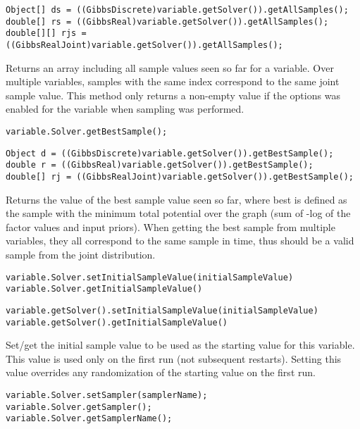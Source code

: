 \ifjava
\begin{lstlisting}
Object[] ds = ((GibbsDiscrete)variable.getSolver()).getAllSamples();
double[] rs = ((GibbsReal)variable.getSolver()).getAllSamples();
double[][] rjs = ((GibbsRealJoint)variable.getSolver()).getAllSamples();
\end{lstlisting}
\fi

Returns an array including all sample values seen so far for a variable. Over multiple variables, samples with the same index correspond to the same joint sample value. This method only returns a non-empty value if the  options was enabled for the variable when sampling was performed.

\ifmatlab
\begin{lstlisting}
variable.Solver.getBestSample();
\end{lstlisting}
\fi

\ifjava
\begin{lstlisting}
Object d = ((GibbsDiscrete)variable.getSolver()).getBestSample();
double r = ((GibbsReal)variable.getSolver()).getBestSample();
double[] rj = ((GibbsRealJoint)variable.getSolver()).getBestSample();
\end{lstlisting}
\fi


Returns the value of the best sample value seen so far, where best is defined as the sample with the minimum total potential over the graph (sum of -log of the factor values and input priors).  When getting the best sample from multiple variables, they all correspond to the same sample in time, thus should be a valid sample from the joint distribution.

\ifmatlab
\begin{lstlisting}
variable.Solver.setInitialSampleValue(initialSampleValue)
variable.Solver.getInitialSampleValue()
\end{lstlisting}
\fi

\ifjava
\begin{lstlisting}
variable.getSolver().setInitialSampleValue(initialSampleValue)
variable.getSolver().getInitialSampleValue()
\end{lstlisting}
\fi

Set/get the initial sample value to be used as the starting value for this variable.  This value is used only on the first run (not subsequent restarts).  Setting this value overrides any randomization of the starting value on the first run.


\ifmatlab
\begin{lstlisting}
variable.Solver.setSampler(samplerName);
variable.Solver.getSampler();
variable.Solver.getSamplerName();
\end{lstlisting}
\fi

